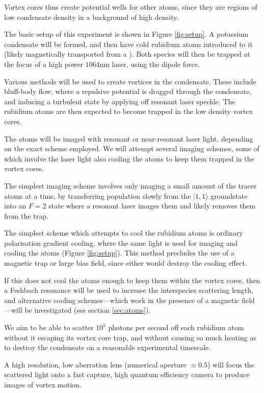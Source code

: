Vortex cores thus create potential wells for other atoms, since they are regions of low condensate density in a background of high density.

The basic setup of this experiment is shown in Figure \ref{fig:setup}. A potassium condensate will be formed, and then have cold rubidium atoms introduced to it (likely magnetically transported from a \mot). Both species will then be trapped at the focus of a high power $1064$nm laser, using the dipole force.

Various methods will be used to create vortices in the condensate. These include bluff-body flow, where a repulsive potential is dragged through the condensate, and inducing a turbulent state by applying off resonant laser speckle. The rubidium atoms are then expected to become trapped in the low density vortex cores.

The atoms will be imaged with resonant or near-resonant laser light, depending on the exact scheme employed. We will attempt several imaging schemes, some of which involve the laser light also cooling the atoms to keep them trapped in the vortex cores.

The simplest imaging scheme involves only imaging a small amount of the tracer atoms at a time, by transferring population slowly from the $|1,1\rangle$ groundstate into an $F=2$ state where a resonant laser images them and likely removes them from the trap.

The simplest scheme which attempts to cool the rubidium atoms is ordinary polarisation gradient cooling, where the same light is used for imaging and cooling the atoms (Figure \ref{fig:setup}). This method precludes the use of a magnetic trap or large bias field, since either would destroy the cooling effect.

If this does not cool the atoms enough to keep them within the vortex cores, then a Feshbach resonance will be used to increase the interspecies scattering length, and alternative cooling schemes---which work in the presence of a magnetic field---will be investigated (see section \ref{sec:atoms}).

We aim to be able to scatter $10^5$ photons per second off each rubidium atom without it escaping its vortex core trap, and without causing so much heating as to destroy the condensate on a reasonable experimental timescale.

A high resolution, low aberration lens (numerical aperture $\approx 0.5$) will focus the scattered light onto a fast capture, high quantum efficiency camera to produce images of vortex motion.

